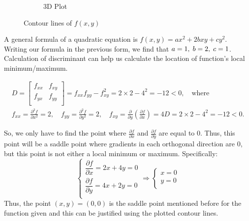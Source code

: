 \begin{figure}[h]
\begin{subfigure}{0.4\textwidth}
		\caption{3D Plot}
		\label{fig:prob_1_contour_lines_3d}
	\end{subfigure}
	\caption{Contour lines of $f(x,y)$ }
	\label{fig:prob_1_contour_lines}
\end{figure}

A general formula of a quadratic equation is $f(x,y) = ax^2 + 2bxy + cy^2$. Writing our formula in the previous form, we find that $a=1, \hspace{1mm} b=2, \hspace{1mm} c=1$.
Calculation of discriminant can help us calculate the location of function's local minimum/maximum.

\begin{equation}
\begin{gathered}
D =
\left[
\begin{array}{cc}
	f_{xx} & f_{xy} \\
	f_{yx} & f_{yy} \\
\end{array}
\right]
= f_{xx} f_{yy} - f^2_{xy} = 2 \times 2 - 4^2 = -12 < 0, \quad \text{where} \\
f_{xx} = \frac{\partial^2 f}{\partial x^2} = 2, \quad
f_{yy} = \frac{\partial^2 f}{\partial y^2} = 2, \quad
f_{xy} = \frac{\partial}{\partial y} \left( \frac{\partial f}{\partial x} \right) = 4
D = 2 \times 2 - 4^2 = -12 < 0.
\end{gathered}
\end{equation}

So, we only have to find the point where $\frac{\partial f}{\partial x}$ and $\frac{\partial f}{\partial y}$ are equal to $0$. Thus, this point will be a saddle point where gradients in each orthogonal direction are $0$, but this point is not either a local minimum or maximum.
Specifically:
\begin{equation}
\left\{
\begin{array}{c}
	\dfrac{\partial f}{\partial x} = 2x + 4y = 0 \\[4mm]
	\dfrac{\partial f}{\partial y} = 4x + 2y = 0 \\
\end{array}
\right.
\Rightarrow
\left\{
\begin{array}{c}
	x = 0\\y=0\\
\end{array}
\right.
\end{equation}
Thus, the point $(x,y) = (0,0)$ is the saddle point mentioned before for the function given and this can be justified using the plotted contour lines.